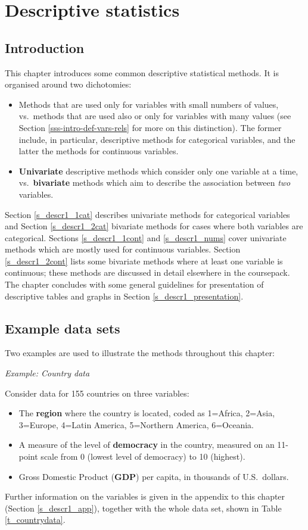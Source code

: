 \chapter{Descriptive statistics} \label{c_descr1}

\section{Introduction}
\label{s_descr1_intro}

This chapter introduces some common descriptive statistical methods. It
is organised around two dichotomies:
\begin{itemize}
\item
Methods that are used only for variables with small numbers of values,
vs.\ methods that are used also or only for variables with many
values (see Section \ref{sss-intro-def-vars-rels} for more on this
distinction). The former include, in particular, descriptive methods for
categorical variables, and the latter the methods for continuous
variables.
\item
\textbf{Univariate} descriptive methods which consider only one variable at a
time, vs.\ \textbf{bivariate} methods which aim to describe the association
between \emph{two} variables.
\end{itemize}
Section \ref{s_descr1_1cat} describes univariate methods for categorical
variables and Section \ref{s_descr1_2cat} bivariate methods for cases
where both variables are categorical. Sections \ref{s_descr1_1cont} and
\ref{s_descr1_nums} cover univariate methods which are mostly used for continuous
variables.
Section \ref{s_descr1_2cont} lists some bivariate
methods where at least one variable is continuous; these methods are
discussed in detail elsewhere in the coursepack.
The chapter concludes with some general guidelines
for presentation of descriptive tables and graphs in Section
\ref{s_descr1_presentation}.

\section{Example data sets}
\label{s_descr1_examples}

Two examples are used to illustrate the methods throughout this chapter:

\emph{Example: Country data}\label{country_example}

Consider data for 155 countries on three
variables:
\begin{itemize}
\item
The \textbf{region} where the country is located,
coded as 1=Africa, 2=Asia, 3=Europe, 4=Latin America, 5=Northern
America, 6=Oceania.
\item
A measure of the level of \textbf{democracy} in the country, measured on
an 11-point scale from 0 (lowest level of democracy) to 10 (highest).
\item
Gross Domestic Product (\textbf{GDP})
per capita, in thousands of U.S.\ dollars.
\end{itemize}
Further information on the variables is given in the appendix to this
chapter (Section \ref{s_descr1_app}), together with the whole data set,
shown in Table \ref{t_countrydata}.

